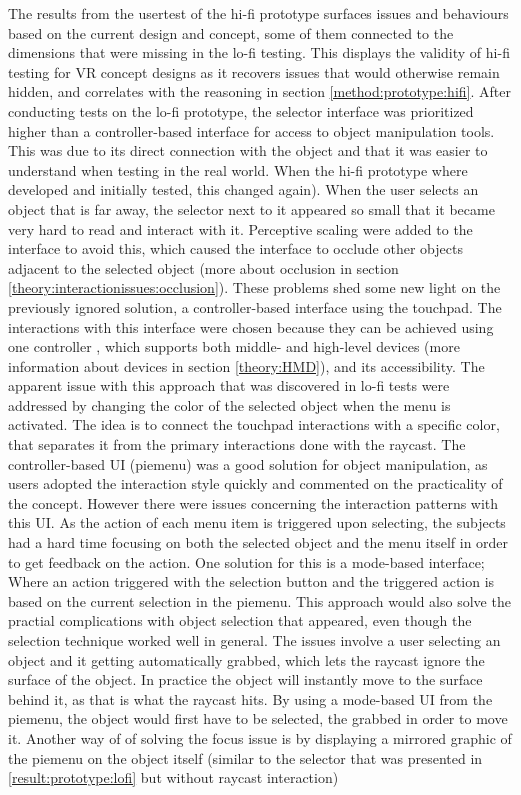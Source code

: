 The results from the usertest of the hi-fi prototype surfaces issues and behaviours based on the current design and concept, some of them connected to the dimensions that were missing in the lo-fi testing. This displays the validity of hi-fi testing for VR concept designs as it recovers issues that would otherwise remain hidden, and correlates with the reasoning in section \ref{method:prototype:hifi}. After conducting tests on the lo-fi prototype, the selector interface was prioritized higher than a controller-based interface for access to object manipulation tools. This was due to its direct connection with the object and that it was easier to understand when testing in the real world. When the hi-fi prototype where developed and initially tested, this changed again). When the user selects an object that is far away, the selector next to it appeared so small that it became very hard to read and interact with it. Perceptive scaling were added to the interface to avoid this, which caused the interface to occlude other objects adjacent to the selected object (more about occlusion in section \ref{theory:interactionissues:occlusion}). These problems shed some new light on the previously ignored solution, a controller-based interface using the touchpad. The interactions with this interface were chosen because they can be achieved using one controller , which supports both middle- and high-level devices (more information about devices in section \ref{theory:HMD}), and its accessibility. The apparent issue with this approach that was discovered in lo-fi tests were addressed by changing the color of the selected object when the menu is activated. The idea is to connect the touchpad interactions with a specific color, that separates it from the primary interactions done with the raycast. The controller-based UI (piemenu) was a good solution for object manipulation, as users adopted the interaction style quickly and commented on the practicality of the concept. However there were issues concerning the interaction patterns with this UI. As the action of each menu item is triggered upon selecting, the subjects had a hard time focusing on both the selected object and the menu itself in order to get feedback on the action. One solution for this is a mode-based interface; Where an action triggered with the selection button and the triggered action is based on the current selection in the piemenu. This approach would also solve the practial complications with object selection that appeared, even though the selection technique worked well in general. The issues involve a user selecting an object and it getting automatically grabbed, which lets the raycast ignore the surface of the object. In practice the object will instantly move to the surface behind it, as that is what the raycast hits. By using a mode-based UI from the piemenu, the object would first have to be selected, the grabbed in order to move it. Another way of of solving the focus issue is by displaying a mirrored graphic of the piemenu on the object itself (similar to the selector that was presented in \ref{result:prototype:lofi} but without raycast interaction)


